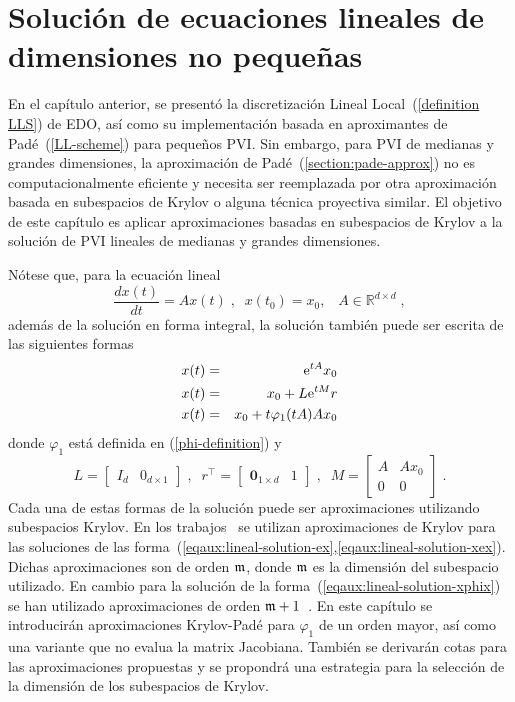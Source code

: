 \chapter{Solución de ecuaciones lineales de dimensiones no pequeñas}\label{chapter:solve-non-smal-lineal-eq}

En el capítulo anterior, se presentó la discretización Lineal Local~(\ref{definition LLS}) de EDO, así como su implementación basada en aproximantes de Padé~(\ref{LL-scheme}) para pequeños PVI. Sin embargo, para PVI de medianas y grandes dimensiones, la aproximación de Padé~(\ref{section:pade-approx}) no es computacionalmente eficiente y necesita ser reemplazada por otra aproximación basada en subespacios de Krylov o alguna técnica proyectiva similar. El objetivo de este capítulo es aplicar aproximaciones basadas en subespacios de Krylov a la solución de PVI lineales de medianas y grandes dimensiones.

Nótese que, para la ecuación lineal
\begin{equation*}
	\frac{dx(t)}{dt}=Ax(t)\;,\;\; x(t_0)=x_0,\;\;\; A\in\mathbb{R}^{d\times d}\;,
\end{equation*}
además de la solución en forma integral, la solución también puede ser escrita de las siguientes formas
\begin{eqnarray}
	x(t) & = & \mathrm{e}^{tA}x_0 \label{eqaux:lineal-solution-ex} \\
	x(t) & = & x_0 + L\mathrm{e}^{tM}r \label{eqaux:lineal-solution-xex} \\
	x(t) & = & x_0 + t\varphi_1(tA)Ax_0 \label{eqaux:lineal-solution-xphix}
\end{eqnarray}
donde $\varphi_1$ está definida en (\ref{phi-definition}) y
\begin{equation*}
	L=\left[ \begin{array}{ll} I_{d} & 0_{d\times 1}\end{array} \right] \;,\;\;
	r^{\intercal }=\left[ \begin{array}{ll} \mathbf{0}_{1\times d} & 1\end{array}\right] \;,\;\;
	M=\left[
	\begin{array}{cc}
	A & Ax_0 \\
	0 & 0
	\end{array}
	\right]\;.
\end{equation*}
Cada una de estas formas de la solución puede ser aproximaciones utilizando subespacios Krylov. En los trabajos~\cite{Saad92,jimenez2012convergence} se utilizan aproximaciones de Krylov para las soluciones de las forma~(\ref{eqaux:lineal-solution-ex},\ref{eqaux:lineal-solution-xex}). Dichas aproximaciones son de orden $\mathfrak{m}$, donde $\mathfrak{m}$ es la dimensión del subespacio utilizado. En cambio para la solución de la forma~(\ref{eqaux:lineal-solution-xphix}) se han utilizado aproximaciones de orden  $\mathfrak{m}+1$~\cite{sidje1998expokit,niesen2012algorithm}. En este capítulo se introducirán aproximaciones Krylov-Padé para $\varphi_1$ de un orden mayor, así como una variante que no evalua la matrix Jacobiana. También se derivarán cotas para las aproximaciones propuestas y se propondrá una estrategia para la selección de la dimensión de los subespacios de Krylov.

